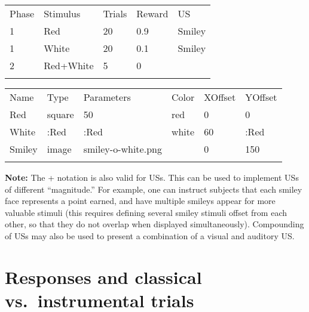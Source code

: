 \documentclass[11pt,]{article}
\renewcommand{\medskip}{}
\begin{document}
\begin{table*}[t]\begin{center}\small\begin{tabular}{@{}lllll@{}}
\hline\noalign{\medskip}
Phase & Stimulus & Trials & Reward & US
\\\noalign{\medskip}
\hline\noalign{\medskip}
1 & Red & 20 & 0.9 & Smiley
\\\noalign{\medskip}
1 & White & 20 & 0.1 & Smiley
\\\noalign{\medskip}
2 & Red+White & 5 & 0 &
\\\noalign{\medskip}
\hline
\noalign{\medskip}
\end{tabular}\caption{A \texttt{Phases.csv} file with a compound stimulus in phase 2.
\label{phases-plus}}
\end{center}\end{table*}

\begin{table*}[t]\begin{center}\small\begin{tabular}{@{}llllll@{}}
\hline\noalign{\medskip}
Name & Type & Parameters & Color & XOffset & YOffset
\\\noalign{\medskip}
\hline\noalign{\medskip}
Red & square & 50 & red & 0 & 0
\\\noalign{\medskip}
White & :Red & :Red & white & 60 & :Red
\\\noalign{\medskip}
Smiley & image & smiley-o-white.png & & 0 & 150
\\\noalign{\medskip}
\hline
\noalign{\medskip}
\end{tabular}\caption{A \texttt{Stimuli.csv} file to go with the \texttt{Phases.csv}
file in Table \ref{phases-plus}. Note that we need to offset the white
square, otherwise it would overlap with the red one when the two are
presented together. \label{stimuli-plus}}
\end{center}\end{table*}

\textbf{Note:} The + notation is also valid for USs. This can be used to
implement USs of different ``magnitude.'' For example, one can instruct
subjects that each smiley face represents a point earned, and have
multiple smileys appear for more valuable stimuli (this requires
defining several smiley stimuli offset from each other, so that they do
not overlap when displayed simultaneously). Compounding of USs may also
be used to present a combination of a visual and auditory US.

\section{Responses and classical vs.~instrumental trials}
\end{document}
